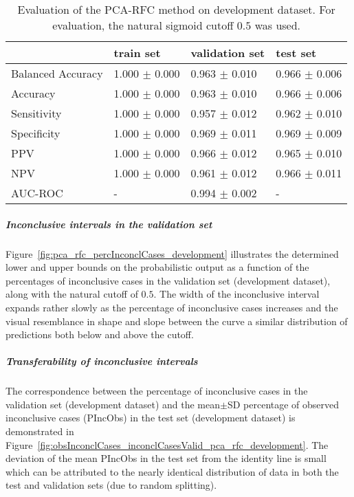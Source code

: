 \begin{table}[ht]
  \caption{Evaluation of the PCA-RFC method on development dataset. 
  For evaluation, the natural sigmoid cutoff $0.5$ was used.}
  \centering
  \begin{tabular}{llll}
      \hline
                        & train set         & validation set      & test set             \\
      \hline
      Balanced Accuracy & 1.000 $\pm$ 0.000   &   0.963 $\pm$ 0.010    &  0.966 $\pm$ 0.006   \\
      Accuracy          & 1.000 $\pm$ 0.000    &   0.963 $\pm$ 0.010  &  0.966 $\pm$ 0.006    \\
      Sensitivity       &  1.000 $\pm$ 0.000   &   0.957 $\pm$ 0.012   &  0.962 $\pm$ 0.010   \\
      Specificity       & 1.000 $\pm$ 0.000    &   0.969 $\pm$ 0.011  &  0.969 $\pm$ 0.009   \\
      PPV               &  1.000 $\pm$ 0.000   &   0.966 $\pm$ 0.012   &  0.965 $\pm$ 0.010   \\
      NPV               &  1.000 $\pm$ 0.000   &   0.961 $\pm$ 0.012  &  0.966 $\pm$ 0.011   \\
      \hline
      AUC-ROC          &  -                   &   0.994 $\pm$ 0.002 &     -  \\
      \hline
  \end{tabular}
 \label{t1:erc_perf_eval_table}
\end{table}


\subparagraph{Inconclusive intervals in the validation set}

Figure~\ref{fig:pca_rfc_percInconclCases_development} illustrates the determined lower and upper bounds on the 
probabilistic output as a function of the percentages of inconclusive cases in the validation set (development dataset), 
along with the natural cutoff of $0.5$.
The width of the inconclusive interval expands rather slowly as the percentage of inconclusive cases increases 
and the visual resemblance in shape and slope between the curve a similar distribution of predictions both below and above the cutoff.

\subparagraph{Transferability of inconclusive intervals}

The correspondence between the percentage of inconclusive cases in the validation set (development dataset) and 
the mean$\pm$SD percentage of observed inconclusive cases (PIncObs) in the test set (development dataset) 
is demonstrated in Figure~\ref{fig:obsInconclCases_inconclCasesValid_pca_rfc_development}.
The deviation of the mean PIncObs in the test set from the 
identity line is small which can be attributed to the nearly identical distribution of data in both the test and validation sets 
(due to random splitting).



